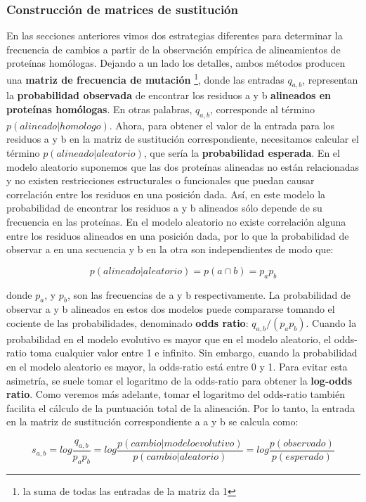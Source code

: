 \subsubsection{Construcción de matrices de sustitución}
En las secciones anteriores vimos dos estrategias diferentes para determinar la frecuencia de cambios a partir de la observación empírica de alineamientos de proteínas homólogas. Dejando a un lado los detalles, ambos métodos producen una \textbf{matriz de frecuencia de mutación} \footnote{la suma de todas las entradas de la matriz da 1}, donde las entradas $q_{a,b}$, representan la \textbf{probabilidad observada} de encontrar los residuos a y b \textbf{alineados en proteínas homólogas}. En otras palabras, $q_{a,b}$, corresponde al término $p(alineado|homologo)$. Ahora, para obtener el valor de la entrada para los residuos a y b en la matriz de sustitución correspondiente, necesitamos calcular el término $p(alineado|aleatorio)$, que sería la \textbf{probabilidad esperada}. En el modelo aleatorio suponemos que las dos proteínas alineadas no están relacionadas y no existen restricciones estructurales o funcionales que puedan causar correlación entre los residuos en una posición dada. Así, en este modelo la probabilidad de encontrar los residuos a y b alineados sólo depende de su frecuencia en las proteínas. En el modelo aleatorio no existe correlación alguna entre los residuos alineados en una posición dada, por lo que la probabilidad de observar a en una secuencia y b en la otra son independientes de modo que:

$$p(alineado|aleatorio) = p(a \cap b) = p_a p_b $$

donde $p_a$, y $p_b$, son las frecuencias de a y b respectivamente. La probabilidad de observar a y b alineados en estos dos modelos puede compararse tomando el cociente de las probabilidades, denominado \textbf{odds ratio}: $q_{a,b}/(p_a p_b)$. Cuando la probabilidad en el modelo evolutivo es mayor que en el modelo aleatorio, el odds-ratio toma cualquier valor entre 1 e infinito. Sin embargo, cuando la probabilidad en el modelo aleatorio es mayor, la odds-ratio está entre 0 y 1. Para evitar esta asimetría, se suele tomar el logaritmo de la odds-ratio para obtener la \textbf{log-odds ratio}. Como veremos más adelante, tomar el logaritmo del odds-ratio también facilita el cálculo de la puntuación total de la alineación. Por lo tanto, la entrada en la matriz de sustitución correspondiente a a y b se calcula como:

$$ s_{a, b} = log \frac{q_{a, b}}{p_a p_b} = log \frac{p(cambio|modelo evolutivo)}{p(cambio|aleatorio)} = log \frac{p(observado)}{p(esperado)} $$

